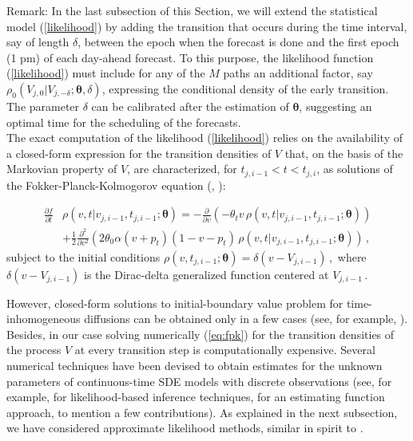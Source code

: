 \documentclass[11pt]{article}
\theoremstyle{definition}
\begin{document}
Remark: In the last subsection of this Section, we will extend the statistical model (\ref{likelihood}) by adding the transition that occurs during the time interval, say of length $\delta$, between the epoch when the forecast is done and the first epoch (1 pm) of each day-ahead forecast. 
To this purpose, the likelihood function (\ref{likelihood}) must include for any of the $M$ paths an additional factor, say $\rho_0 (V_{j, 0}|V_{j, -\delta};\bm{\theta},\delta)$, expressing the conditional density of the early transition. The parameter $\delta$ can be calibrated after the estimation of $\bm{\theta}$, suggesting an optimal time for the scheduling of the forecasts. \\
 
The exact computation of the likelihood (\ref{likelihood}) relies on the availability of a closed-form expression for the transition densities of $V$ that, on the basis of the Markovian property of $V$, are characterized, for $ t_{j, i-1} < t < t_{j,i}$,  as solutions of the Fokker-Planck-Kolmogorov equation (\cite[36]{iacus1}, \cite[61-68]{saso}):

\begin{align}
\frac{ \partial f }{\partial t } & \rho(v ,t \vert v_{j,i-1} ,  t_{j,i-1} ; \bm{\theta} )= - \frac{\partial}{ \partial v} (- \theta_t v \, \rho(v ,t \vert v_{j,i-1} ,  t_{j,i-1} ; \bm{\theta} ) ) \nonumber \\
& + \frac{1}{2} \frac{\partial^2}{ \partial v^2} ( 2 \theta_0 \alpha (v+ p_t) (1 - v- p_t) \, \rho(v ,t \vert v_{j,i-1} ,  t_{j,i-1} ; \bm{\theta} ) )\,,  \label{eq:fpk}
\end{align}
subject to the initial conditions $\rho(v , t_{j, i-1} ; \bm{\theta} ) = \delta(v - V_{j, i-1}) \,,$ where $ \delta(v - V_{j, i-1})$ is the Dirac-delta generalized function centered at $ V_{j, i-1}\,.$

However, closed-form solutions to initial-boundary value problem for time-in\-ho\-mo\-geneous diffusions can be obtained only in a few cases (see, for example, \autocite[Section 3.1]{eglix}). Besides, in our case solving numerically (\ref{eq:fpk}) for the transition densities of the process $V$ at every transition step is computationally expensive. 
Several numerical techniques have been devised to obtain estimates for the unknown parameters of continuous-time SDE models with discrete observations (see, for example, \cite{prewo} for likelihood-based inference techniques, \cite{Sor} for an estimating function approach, to mention a few contributions). As explained in the next subsection, we have considered approximate likelihood methods, similar in spirit to \autocite[Section 11.4]{saso}.
\end{document}
